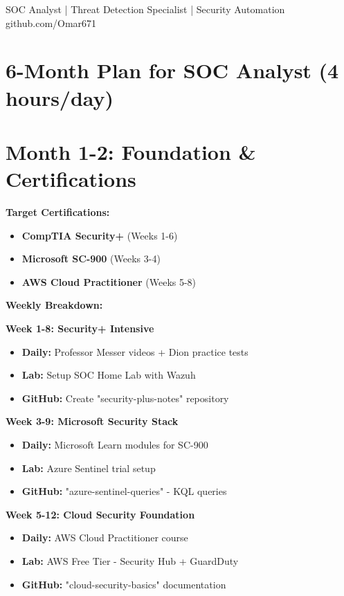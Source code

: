 \documentclass[11pt,a4paper]{article}
\begin{document}
\begin{center}
    \vspace{0.2cm}
    {\large\color{cyberblue} SOC Analyst | Threat Detection Specialist | Security Automation} \\
    \vspace{0.1cm}
\quad
     github.com/Omar671
\end{center}

\section*{6-Month Plan for SOC Analyst (4 hours/day) }
\section*{Month 1-2: Foundation \& Certifications}

\textbf{\color{cyberblue} Target Certifications:}
\begin{itemize}
    \item \textbf{CompTIA Security+} (Weeks 1-6)
    \item \textbf{Microsoft SC-900} (Weeks 3-4) 
    \item \textbf{AWS Cloud Practitioner} (Weeks 5-8)
\end{itemize}

\textbf{\color{cybergreen} Weekly Breakdown:}

\textbf{Week 1-8: Security+ Intensive}
\begin{itemize}
    \item \textbf{Daily:} Professor Messer videos + Dion practice tests
    \item \textbf{Lab:} Setup SOC Home Lab with Wazuh
    \item \textbf{GitHub:} Create "security-plus-notes" repository
\end{itemize}

\textbf{Week 3-9: Microsoft Security Stack}
\begin{itemize}
    \item \textbf{Daily:} Microsoft Learn modules for SC-900
    \item \textbf{Lab:} Azure Sentinel trial setup
    \item \textbf{GitHub:} "azure-sentinel-queries" - KQL queries
\end{itemize}

\textbf{Week 5-12: Cloud Security Foundation}
\begin{itemize}
    \item \textbf{Daily:} AWS Cloud Practitioner course
    \item \textbf{Lab:} AWS Free Tier - Security Hub + GuardDuty
    \item \textbf{GitHub:} "cloud-security-basics" documentation
\end{itemize}
\end{document}
